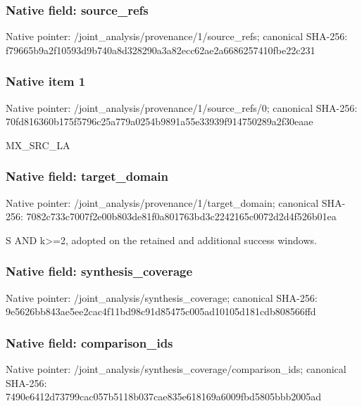 \documentclass[10pt,a4paper]{article}
\begin{document}
\subsubsection{Native field: source\_\allowbreak{}refs}
Native pointer: /joint\_\allowbreak{}analysis/provenance/1/source\_\allowbreak{}refs; canonical SHA-256: f79665b9a2f10593d9b740a8d328290a3a82ecc62ae2a6686257410fbe22c231

\subsubsection{Native item 1}
Native pointer: /joint\_\allowbreak{}analysis/provenance/1/source\_\allowbreak{}refs/0; canonical SHA-256: 70fd816360b175f5796c25a779a0254b9891a55e33939f914750289a2f30eaae

\begingroup\raggedright\sloppy MX\_\allowbreak{}SRC\_\allowbreak{}LA\par\endgroup

\subsubsection{Native field: target\_\allowbreak{}domain}
Native pointer: /joint\_\allowbreak{}analysis/provenance/1/target\_\allowbreak{}domain; canonical SHA-256: 7082c733c7007f2e00b803de81f0a801763bd3c2242165c0072d2d4f526b01ea

\begingroup\raggedright\sloppy S AND k>=\allowbreak{}2,\allowbreak{} adopted on the retained and additional success windows.\par\endgroup

\subsubsection{Native field: synthesis\_\allowbreak{}coverage}
Native pointer: /joint\_\allowbreak{}analysis/synthesis\_\allowbreak{}coverage; canonical SHA-256: 9e5626bb843ae5ee2cac4f11bd98c91d85475c005ad10105d181cdb808566ffd

\subsubsection{Native field: comparison\_\allowbreak{}ids}
Native pointer: /joint\_\allowbreak{}analysis/synthesis\_\allowbreak{}coverage/comparison\_\allowbreak{}ids; canonical SHA-256: 7490e6412d73799cac057b5118b037cae835e618169a6009fbd5805bbb2005ad
\end{document}
